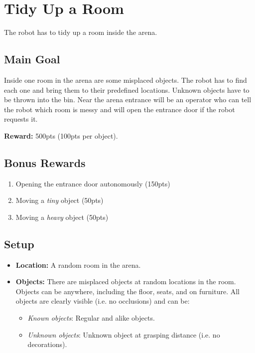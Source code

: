 \section{Tidy Up a Room}
The robot has to tidy up a room inside the arena.


\subsection{Main Goal}
Inside one room in the arena are some misplaced objects. The robot has to find each one and bring them to their predefined locations. Unknown objects have to be thrown into the bin. Near the arena entrance will be an operator who can tell the robot which room is messy and will open the entrance door if the robot requests it.

\noindent\textbf{Reward:} 500pts (100pts per object).

\subsection{Bonus Rewards}
\begin{enumerate}[nosep]
	\item Opening the entrance door autonomously (150pts)
	\item Moving a \emph{tiny} object (50pts)
	\item Moving a \emph{heavy} object (50pts)
\end{enumerate}


\subsection{Setup}
\begin{itemize}[nosep]
	\item \textbf{Location:} A random room in the arena.

	\item \textbf{Objects:} There are misplaced objects at random locations in the room.
	Objects can be anywhere, including the floor, seats, and on furniture.
	All objects are clearly visible (i.e. no occlusions) and can be:
	\begin{itemize}[nosep]
		\item\textit{Known objects}: Regular and alike objects.
		\item\textit{Unknown objects}: Unknown object at grasping distance (i.e. no decorations).
	\end{itemize}
\end{itemize}

